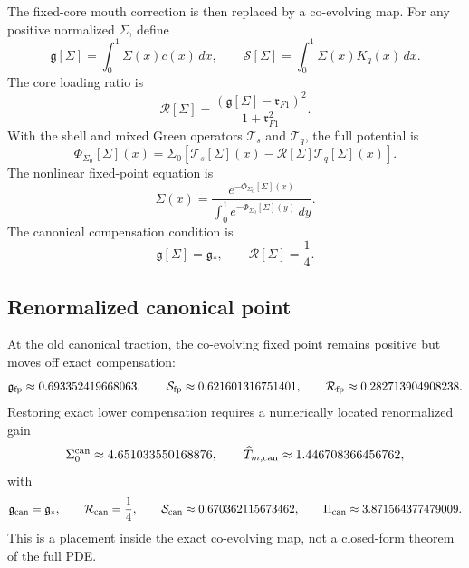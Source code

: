 The fixed-core mouth correction is then replaced by a co-evolving map.  For any positive normalized \(\Sigma\), define
\begin{equation}
\label{eq:app-part04-gS-functionals}
\mathfrak g[\Sigma]=\int_0^1\Sigma(x)c(x)\,dx,
\qquad
\mathcal S[\Sigma]=\int_0^1\Sigma(x)K_q(x)\,dx.
\end{equation}
The core loading ratio is
\begin{equation}
\label{eq:app-part04-R-Sigma}
\mathcal R[\Sigma]
=
\frac{(\mathfrak g[\Sigma]-\mathfrak r_{F1})^2}{1+\mathfrak r_{F1}^2}.
\end{equation}
With the shell and mixed Green operators \(\mathcal T_s\) and \(\mathcal T_q\), the full potential is
\begin{equation}
\label{eq:app-part04-Phi-Sigma}
\Phi_{\Sigma_0}[\Sigma](x)
=
\Sigma_0\left[
\mathcal T_s[\Sigma](x)-\mathcal R[\Sigma]\mathcal T_q[\Sigma](x)
\right].
\end{equation}
The nonlinear fixed-point equation is
\begin{equation}
\label{eq:app-part04-coevolving-fixedpoint}
\Sigma(x)=\frac{e^{-\Phi_{\Sigma_0}[\Sigma](x)}}{\int_0^1e^{-\Phi_{\Sigma_0}[\Sigma](y)}\,dy}.
\end{equation}
The canonical compensation condition is
\begin{equation}
\label{eq:app-part04-coevolving-canonical-condition}
\mathfrak g[\Sigma]=\mathfrak g_*,
\qquad
\mathcal R[\Sigma]=\frac14.
\end{equation}

\subsection{Renormalized canonical point}
\label{subsec:app-part04-renormalized-canonical-point}

At the old canonical traction, the co-evolving fixed point remains positive but moves off exact compensation:
\begin{equation}
\label{eq:app-part04-frozen-traction-values}
\mathfrak g_{\rm fp}\approx0.693352419668063,
\qquad
\mathcal S_{\rm fp}\approx0.621601316751401,
\qquad
\mathcal R_{\rm fp}\approx0.282713904908238.
\end{equation}
Restoring exact lower compensation requires a numerically located renormalized gain
\begin{equation}
\label{eq:app-part04-renormalized-Sigma0}
\Sigma_0^{\rm can}\approx4.651033550168876,
\qquad
\widehat T_{m,{\rm can}}\approx1.446708366456762,
\end{equation}
with
\begin{equation}
\label{eq:app-part04-renormalized-canonical-values}
\mathfrak g_{\rm can}=\mathfrak g_*,
\qquad
\mathcal R_{\rm can}=\frac14,
\qquad
\mathcal S_{\rm can}\approx0.670362115673462,
\qquad
\Pi_{\rm can}\approx3.871564377479009.
\end{equation}
This is a \StatusNumerical{} placement inside the exact co-evolving map, not a closed-form theorem of the full PDE.

